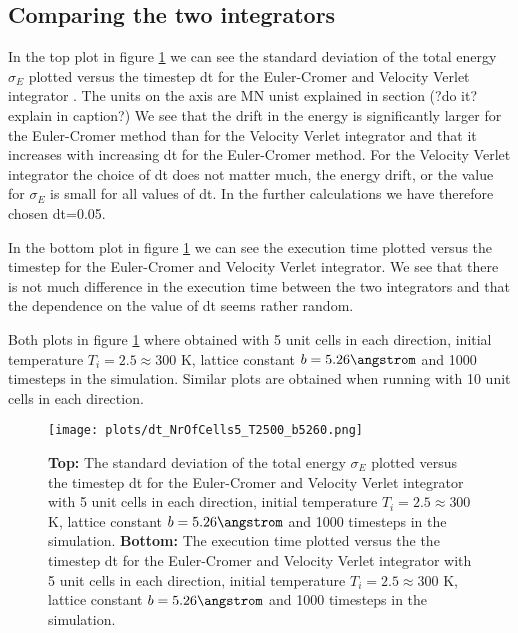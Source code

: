 \documentclass[11pt,a4wide]{article}
\begin{document}
\subsection{Comparing the two integrators} \label{sec: integrators_results}

In the top plot in figure \ref{fig: dt} we can see the standard deviation of the total energy $\sigma_E$ plotted versus the timestep dt for the Euler-Cromer and Velocity Verlet integrator . The units on the axis are MN unist explained in section (?do it? explain in caption?) We see that the drift in the energy is significantly larger for the Euler-Cromer method than for the Velocity Verlet integrator and that it increases with increasing dt for the Euler-Cromer method. For the Velocity Verlet integrator the choice of dt does not matter much, the energy drift, or the value for $\sigma_E$ is small for all values of dt. In the further calculations we have therefore chosen dt=0.05.  

In the bottom plot in figure \ref{fig: dt} we can see the execution time plotted versus the timestep for the Euler-Cromer and Velocity Verlet integrator. We see that there is not much difference in the execution time between the two integrators and that the dependence on the value of dt seems rather random. 

Both plots in figure \ref{fig: dt} where obtained with 5 unit cells in each direction, initial temperature $T_i = 2.5 \approx 300$ K, lattice constant $b=5.26 \angstrom$ and 1000 timesteps in the simulation. Similar plots are obtained when running with 10 unit cells in each direction. 

\begin{figure}[htp]
\centering
\texttt{[image: plots/dt\_NrOfCells5\_T2500\_b5260.png]}
\caption{\textbf{Top:} The standard deviation of the total energy $\sigma_E$ plotted versus the timestep dt for the Euler-Cromer and Velocity Verlet integrator with 5 unit cells in each direction, initial temperature $T_i = 2.5 \approx 300$ K, lattice constant $b=5.26 \angstrom$ and 1000 timesteps in the simulation. \textbf{Bottom:} The execution time plotted versus the the timestep dt for the Euler-Cromer and Velocity Verlet integrator with 5 unit cells in each direction, initial temperature $T_i = 2.5 \approx 300$ K, lattice constant $b=5.26 \angstrom$ and 1000 timesteps in the simulation.}
\label{fig: dt}
\end{figure}
\end{document}
